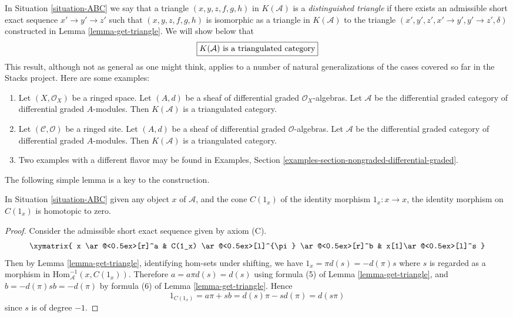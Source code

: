 \noindent
In Situation \ref{situation-ABC} we say that a triangle
$(x, y, z, f, g, h)$ in $K(\mathcal{A})$ is a
{\it distinguished triangle} if there exists an admissible
short exact sequence $x' \to y' \to z'$ such that
$(x, y, z, f, g, h)$ is isomorphic as a triangle in $K(\mathcal{A})$
to the triangle $(x', y', z', x' \to y', y' \to z', \delta)$
constructed in Lemma \ref{lemma-get-triangle}. We will show below that
$$
\fbox{$K(\mathcal{A})$ is a triangulated category}
$$
This result, although not as general as one might think, applies to a
number of natural generalizations of the cases covered so far in the
Stacks project. Here are some examples:
\begin{enumerate}
\item Let $(X, \mathcal{O}_X)$ be a ringed space. Let $(A, d)$ be a
sheaf of differential graded $\mathcal{O}_X$-algebras. Let
$\mathcal{A}$ be the differential graded category of differential
graded $A$-modules. Then $K(\mathcal{A})$ is a triangulated category.
\item Let $(\mathcal{C}, \mathcal{O})$ be a ringed site. Let $(A, d)$ be a
sheaf of differential graded $\mathcal{O}$-algebras. Let
$\mathcal{A}$ be the differential graded category of differential
graded $A$-modules. Then $K(\mathcal{A})$ is a triangulated category.
\item Two examples with a different flavor may be found in Examples, Section
\ref{examples-section-nongraded-differential-graded}.
\end{enumerate}

\noindent
The following simple lemma is a key to the construction.

\begin{lemma}
\label{lemma-id-cone-null}
In Situation \ref{situation-ABC}
given any object $x$ of $\mathcal{A}$, and the cone $C(1_x)$ of the
identity morphism $1_x : x \to x$, the identity morphism on
$C(1_x)$ is homotopic to zero.
\end{lemma}

\begin{proof}
Consider the admissible short exact sequence given by axiom (C).
$$
\xymatrix{
x \ar@<0.5ex>[r]^a  &
C(1_x) \ar@<0.5ex>[l]^{\pi} \ar@<0.5ex>[r]^b &
x[1]\ar@<0.5ex>[l]^s
}
$$
Then by Lemma \ref{lemma-get-triangle}, identifying hom-sets under
shifting, we have $1_x=\pi d(s)=-d(\pi)s$ where $s$ is regarded as
a morphism in $\mathrm{Hom}_{\mathcal{A}}^{-1}(x,C(1_x))$. Therefore
$a=a\pi d(s)=d(s)$ using formula (5) of Lemma \ref{lemma-get-triangle},
and $b=-d(\pi)sb=-d(\pi)$ by formula (6) of Lemma \ref{lemma-get-triangle}.
Hence
$$
1_{C(1_x)}=a\pi+sb=d(s)\pi-sd(\pi)=d(s\pi)
$$
since $s$ is of degree $-1$.
\end{proof}

